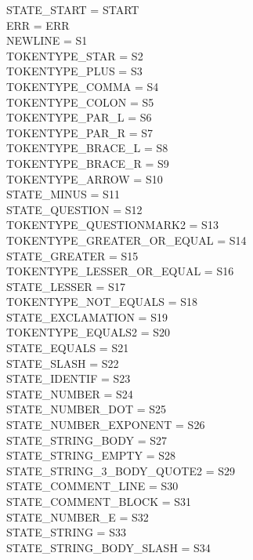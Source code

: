 \documentclass[12pt]{article}
\begin{document}
\begin{tiny}
    \begin{multicols}{2}
    STATE\_START = START\\
    ERR = ERR\\
    NEWLINE = S1\\
    TOKENTYPE\_STAR = S2\\
    TOKENTYPE\_PLUS = S3\\
    TOKENTYPE\_COMMA = S4\\
    TOKENTYPE\_COLON = S5\\
    TOKENTYPE\_PAR\_L = S6\\
    TOKENTYPE\_PAR\_R = S7\\
    TOKENTYPE\_BRACE\_L = S8\\
    TOKENTYPE\_BRACE\_R = S9\\
    TOKENTYPE\_ARROW = S10\\
    STATE\_MINUS = S11\\
    STATE\_QUESTION = S12\\
    TOKENTYPE\_QUESTIONMARK2 = S13\\
    TOKENTYPE\_GREATER\_OR\_EQUAL = S14\\
    STATE\_GREATER = S15\\
    TOKENTYPE\_LESSER\_OR\_EQUAL = S16\\
    STATE\_LESSER = S17\\
    TOKENTYPE\_NOT\_EQUALS = S18\\
    STATE\_EXCLAMATION = S19\\
    TOKENTYPE\_EQUALS2 = S20\\
    STATE\_EQUALS = S21\\
    STATE\_SLASH = S22\\
    STATE\_IDENTIF = S23\\
    STATE\_NUMBER = S24\\
    STATE\_NUMBER\_DOT = S25\\
    STATE\_NUMBER\_EXPONENT = S26\\
    STATE\_STRING\_BODY = S27\\
    STATE\_STRING\_EMPTY = S28\\
    STATE\_STRING\_3\_BODY\_QUOTE2 = S29\\
    STATE\_COMMENT\_LINE = S30\\
    STATE\_COMMENT\_BLOCK = S31\\
    STATE\_NUMBER\_E = S32\\
    STATE\_STRING = S33\\
    STATE\_STRING\_BODY\_SLASH = S34\\

\end{multicols}
\end{tiny}
\end{document}
